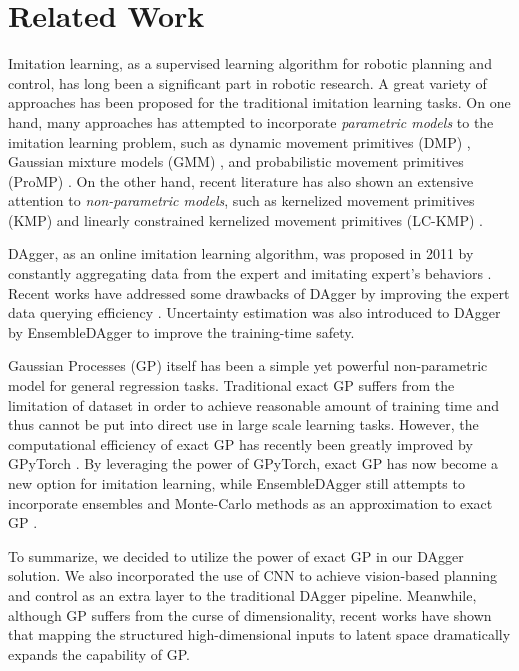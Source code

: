 \documentclass[11pt, reqno, letterpaper, twoside]{amsart}
\begin{document}
\section{Related Work}
Imitation learning, as a supervised learning algorithm for robotic planning and control, has long been a significant part in robotic research. A great variety of approaches has been proposed for the traditional imitation learning tasks. On one hand, many approaches has attempted to incorporate \textit{parametric models} to the imitation learning problem, such as dynamic movement primitives (DMP) \cite{dmp}, Gaussian mixture models (GMM) \cite{gmm-for-IL}, and probabilistic movement primitives (ProMP) \cite{ProMP}. On the other hand, recent literature has also shown an extensive attention to \textit{non-parametric models}, such as kernelized movement primitives (KMP) \cite{non-parametric-il} and linearly constrained kernelized movement primitives (LC-KMP) \cite{non-parametric-il-linear-constraints}.

DAgger, as an online imitation learning algorithm, was proposed in 2011 by constantly aggregating data from the expert and imitating expert's behaviors \cite{dagger}. Recent works have addressed some drawbacks of DAgger by improving the expert data querying efficiency \cite{safe-dagger}. Uncertainty estimation was also introduced to DAgger by EnsembleDAgger \cite{ensemble-dagger} to improve the training-time safety.

Gaussian Processes (GP) itself has been a simple yet powerful non-parametric model for general regression tasks. Traditional exact GP suffers from the limitation of dataset in order to achieve reasonable amount of training time and thus cannot be put into direct use in large scale learning tasks. However, the computational efficiency of exact GP has recently been greatly improved by GPyTorch \cite{exact-gp-million,GPyTorch}. By leveraging the power of GPyTorch, exact GP has now become a new option for imitation learning, while EnsembleDAgger still attempts to incorporate ensembles and Monte-Carlo methods as an approximation to exact GP \cite{ensemble-dagger}.

To summarize, we decided to utilize the power of exact GP in our DAgger solution. We also incorporated the use of CNN to achieve vision-based planning and control as an extra layer to the traditional DAgger pipeline. Meanwhile, although GP suffers from the curse of dimensionality, recent works have shown that mapping the structured high-dimensional inputs to latent space \cite{grosnit2021high} dramatically expands the capability of GP.
\end{document}
